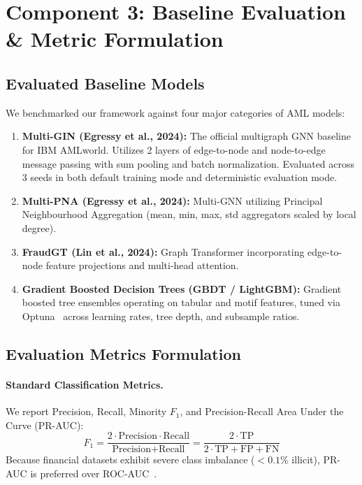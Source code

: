 \documentclass[11pt,a4paper]{article}
\begin{document}
\section{Component 3: Baseline Evaluation \& Metric Formulation}
\label{sec:comp3_baseline}

\subsection{Evaluated Baseline Models}
We benchmarked our framework against four major categories of AML models:
\begin{enumerate}[leftmargin=*]
    \item \textbf{Multi-GIN (Egressy et al., 2024):} The official multigraph GNN baseline for IBM AMLworld. Utilizes 2 layers of edge-to-node and node-to-edge message passing with sum pooling and batch normalization. Evaluated across 3 seeds in both default training mode and deterministic evaluation mode.
    \item \textbf{Multi-PNA (Egressy et al., 2024):} Multi-GNN utilizing Principal Neighbourhood Aggregation (mean, min, max, std aggregators scaled by local degree).
    \item \textbf{FraudGT (Lin et al., 2024):} Graph Transformer incorporating edge-to-node feature projections and multi-head attention.
    \item \textbf{Gradient Boosted Decision Trees (GBDT / LightGBM):} Gradient boosted tree ensembles operating on tabular and motif features, tuned via Optuna~\cite{akiba2019optuna} across learning rates, tree depth, and subsample ratios.
\end{enumerate}

\subsection{Evaluation Metrics Formulation}
\paragraph{Standard Classification Metrics.} We report Precision, Recall, Minority $F_1$, and Precision-Recall Area Under the Curve (PR-AUC):
\begin{equation}
F_1 = \frac{2 \cdot \text{Precision} \cdot \text{Recall}}{\text{Precision} + \text{Recall}} = \frac{2 \cdot \text{TP}}{2 \cdot \text{TP} + \text{FP} + \text{FN}}
\end{equation}
Because financial datasets exhibit severe class imbalance ($<0.1\%$ illicit), PR-AUC is preferred over ROC-AUC~\cite{saito2015prroc}.
\end{document}

